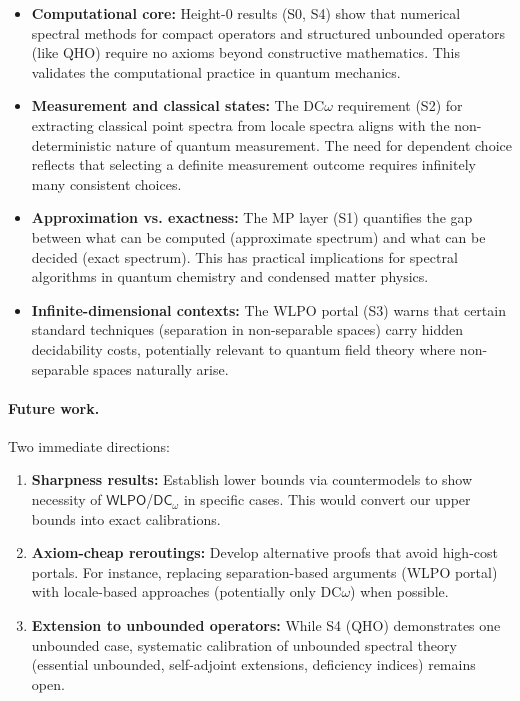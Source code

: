 \documentclass[11pt]{article}
\newcommand{\WLPO}{\mathsf{WLPO}}
\newcommand{\DCw}{\mathsf{DC}_{\omega}}
\theoremstyle{plain}
\theoremstyle{definition}
\theoremstyle{remark}
\begin{document}
\begin{itemize}
\item \textbf{Computational core:} Height-0 results (S0, S4) show that numerical spectral methods for compact operators and structured unbounded operators (like QHO) require no axioms beyond constructive mathematics. This validates the computational practice in quantum mechanics.

\item \textbf{Measurement and classical states:} The DC$\omega$ requirement (S2) for extracting classical point spectra from locale spectra aligns with the non-deterministic nature of quantum measurement. The need for dependent choice reflects that selecting a definite measurement outcome requires infinitely many consistent choices.

\item \textbf{Approximation vs. exactness:} The MP layer (S1) quantifies the gap between what can be computed (approximate spectrum) and what can be decided (exact spectrum). This has practical implications for spectral algorithms in quantum chemistry and condensed matter physics.

\item \textbf{Infinite-dimensional contexts:} The WLPO portal (S3) warns that certain standard techniques (separation in non-separable spaces) carry hidden decidability costs, potentially relevant to quantum field theory where non-separable spaces naturally arise.
\end{itemize}

\paragraph{Future work.}
Two immediate directions: 
\begin{enumerate}
\item \textbf{Sharpness results:} Establish lower bounds via countermodels to show necessity of $\WLPO$/$\DCw$ in specific cases. This would convert our upper bounds into exact calibrations.

\item \textbf{Axiom-cheap reroutings:} Develop alternative proofs that avoid high-cost portals. For instance, replacing separation-based arguments (WLPO portal) with locale-based approaches (potentially only DC$\omega$) when possible.

\item \textbf{Extension to unbounded operators:} While S4 (QHO) demonstrates one unbounded case, systematic calibration of unbounded spectral theory (essential unbounded, self-adjoint extensions, deficiency indices) remains open.
\end{enumerate}
\end{document}
